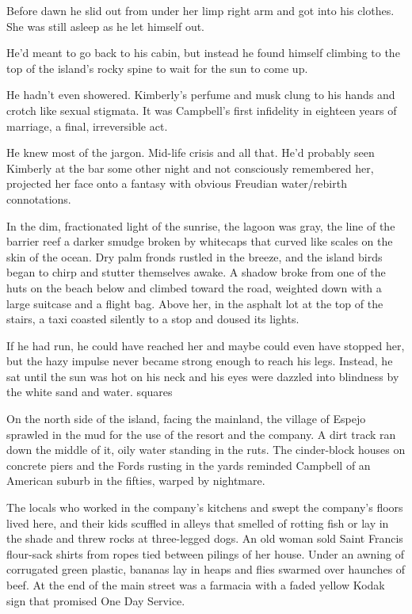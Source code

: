 Before dawn he slid out from under her limp right arm and got into his clothes. She was still asleep as he let himself out.

He'd meant to go back to his cabin, but instead he found himself climbing to the top of the island's rocky spine to wait for the sun to come up.

He hadn't even showered. Kimberly's perfume and musk clung to his hands and crotch like sexual stigmata. It was Campbell's first infidelity in eighteen years of marriage, a final, irreversible act.

He knew most of the jargon. Mid-life crisis and all that. He'd probably seen Kimberly at the bar some other night and not consciously remembered her, projected her face onto a fantasy with obvious Freudian water/rebirth connotations.

In the dim, fractionated light of the sunrise, the lagoon was gray, the line of the barrier reef a darker smudge broken by whitecaps that curved like scales on the skin of the ocean. Dry palm fronds rustled in the breeze, and the island birds began to chirp and stutter themselves awake. A shadow broke from one of the huts on the beach below and climbed toward the road, weighted down with a large suitcase and a flight bag. Above her, in the asphalt lot at the top of the stairs, a taxi coasted silently to a stop and doused its lights.

If he had run, he could have reached her and maybe could even have stopped her, but the hazy impulse never became strong enough to reach his legs. Instead, he sat until the sun was hot on his neck and his eyes were dazzled into blindness by the white sand and water.
squares

On the north side of the island, facing the mainland, the village of Espejo sprawled in the mud for the use of the resort and the company. A dirt track ran down the middle of it, oily water standing in the ruts. The cinder-block houses on concrete piers and the Fords rusting in the yards reminded Campbell of an American suburb in the fifties, warped by nightmare.

The locals who worked in the company's kitchens and swept the company's floors lived here, and their kids scuffled in alleys that smelled of rotting fish or lay in the shade and threw rocks at three-legged dogs. An old woman sold Saint Francis flour-sack shirts from ropes tied between pilings of her house. Under an awning of corrugated green plastic, bananas lay in heaps and flies swarmed over haunches of beef. At the end of the main street was a farmacia with a faded yellow Kodak sign that promised One Day Service.

